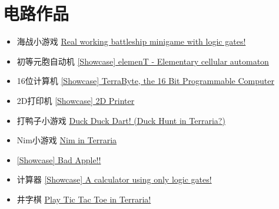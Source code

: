 \section{电路作品}
\begin{itemize}
\item 海战小游戏 \href{https://forums.terraria.org/index.php?threads/real-working-battleship-minigame-with-logic-gates.85957/}{Real working battleship minigame with logic gates!}
\item 初等元胞自动机 \href{https://forums.terraria.org/index.php?threads/showcase-element-elementary-cellular-automaton.75798/}{[Showcase] elemenT - Elementary cellular automaton}
\item 16位计算机 \href{https://forums.terraria.org/index.php?threads/showcase-terrabyte-the-16-bit-programmable-computer.85479/}{[Showcase] TerraByte, the 16 Bit Programmable Computer}
\item 2D打印机 \href{https://forums.terraria.org/index.php?threads/showcase-2d-printer.75766/}{[Showcase] 2D Printer}
\item 打鸭子小游戏 \href{https://forums.terraria.org/index.php?threads/duck-duck-dart-duck-hunt-in-terraria.45200/}{Duck Duck Dart! (Duck Hunt in Terraria?)}
\item Nim小游戏 \href{https://forums.terraria.org/index.php?threads/nim-in-terraria.76089/}{Nim in Terraria}
\item \href{https://forums.terraria.org/index.php?threads/showcase-bad-apple.76348/}{[Showcase] Bad Apple!!}
\item 计算器 \href{https://forums.terraria.org/index.php?threads/showcase-a-calculator-using-only-logic-gates.76453/}{[Showcase] A calculator using only logic gates!}
\item 井字棋 \href{https://forums.terraria.org/index.php?threads/play-tic-tac-toe-in-terraria.76804/}{Play Tic Tac Toe in Terraria!}

\end{itemize}

